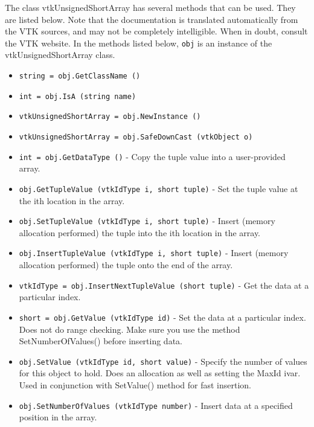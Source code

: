 The class vtkUnsignedShortArray has several methods that can be used.
  They are listed below.
Note that the documentation is translated automatically from the VTK sources,
and may not be completely intelligible.  When in doubt, consult the VTK website.
In the methods listed below, \verb|obj| is an instance of the vtkUnsignedShortArray class.
\begin{itemize}
\item  \verb|string = obj.GetClassName ()|

\item  \verb|int = obj.IsA (string name)|

\item  \verb|vtkUnsignedShortArray = obj.NewInstance ()|

\item  \verb|vtkUnsignedShortArray = obj.SafeDownCast (vtkObject o)|

\item  \verb|int = obj.GetDataType ()| -  Copy the tuple value into a user-provided array.

\item  \verb|obj.GetTupleValue (vtkIdType i, short tuple)| -  Set the tuple value at the ith location in the array.

\item  \verb|obj.SetTupleValue (vtkIdType i, short tuple)| -  Insert (memory allocation performed) the tuple into the ith location
 in the array.

\item  \verb|obj.InsertTupleValue (vtkIdType i, short tuple)| -  Insert (memory allocation performed) the tuple onto the end of the array.

\item  \verb|vtkIdType = obj.InsertNextTupleValue (short tuple)| -  Get the data at a particular index.

\item  \verb|short = obj.GetValue (vtkIdType id)| -  Set the data at a particular index. Does not do range checking. Make sure
 you use the method SetNumberOfValues() before inserting data.

\item  \verb|obj.SetValue (vtkIdType id, short value)| -  Specify the number of values for this object to hold. Does an
 allocation as well as setting the MaxId ivar. Used in conjunction with
 SetValue() method for fast insertion.

\item  \verb|obj.SetNumberOfValues (vtkIdType number)| -  Insert data at a specified position in the array.


\end{itemize}
